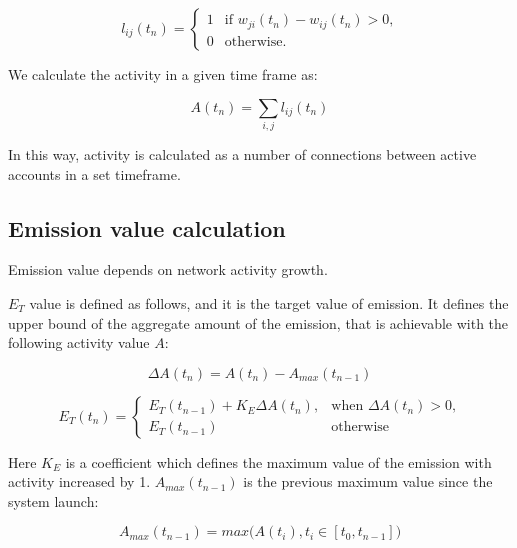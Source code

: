 \documentclass[a4paper,12pt]{article}
\begin{document}
$$
l_{ij}(t_n) = \begin{cases}
 1
 & \text{if $w_{ji}(t_n)-w_{ij}(t_n) > 0$,}\\
 0 & \text{otherwise.}
\end{cases}
$$

We calculate the activity in a given time frame as:


$$
A(t_n) = \sum_{i,j} l_{ij}(t_n)
$$

In this way, activity is calculated as a number of connections between active accounts in a set timeframe. 


\subsection{Emission value calculation}

Emission value depends on network activity growth.

$E_T$ value is defined as follows, and it is the target value of emission. It defines the upper bound of the aggregate amount of the emission, that is achievable with the following activity value $A$:

% 

$$
\Delta A(t_n) = A(t_n) - A_{max}(t_{n-1})
$$

$$
E_T(t_n) = \begin{cases}
 E_T(t_{n-1}) + K_E \Delta A(t_n),
 & \text{when $\Delta A(t_n) > 0$,}\\
 E_T(t_{n-1}) & \text{otherwise}
\end{cases}
$$

Here $K_E$ is a coefficient which defines the maximum value of the emission with activity increased by 1. $A_{max}(t_{n-1})$ is the previous maximum value since the system launch:


$$
    A_{max}(t_{n-1}) = max \Big ( A(t_i), t_i \in [t_0, t_{n-1}] \Big )
$$
\end{document}
